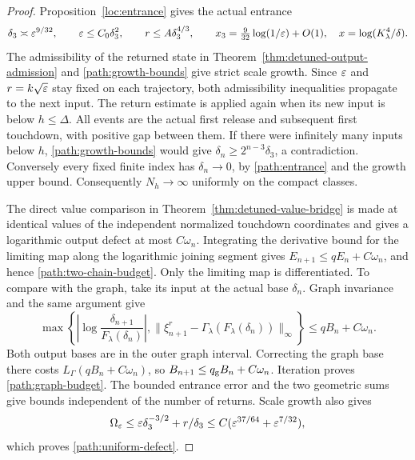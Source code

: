 \begin{proof}
Proposition~\ref{loc:entrance} gives the actual entrance
\begin{equation}
 \delta_3\asymp\varepsilon^{9/32},\qquad
 \varepsilon\le C_0\delta_3^2,\qquad
 r\le A\delta_3^{4/3},\qquad
 x_3=\tfrac9{32}\log(1/\varepsilon)+O(1),
 \quad x=\log(K_\lambda^4/\delta).
 \label{path:entrance}
\end{equation}
The admissibility of the returned state in
Theorem~\ref{thm:detuned-output-admission} and
\eqref{path:growth-bounds} give strict scale growth.  Since $\varepsilon$ and $r=k\sqrt{\varepsilon}$ stay
fixed on each trajectory, both admissibility inequalities propagate
to the next input.  The return estimate is applied again when its new input
is below $h\le\Delta$.  All events are the
actual first release and subsequent first touchdown, with positive
gap between them.  If there were infinitely many inputs below $h$,
\eqref{path:growth-bounds} would give $\delta_n\ge2^{n-3}\delta_3$,
a contradiction.  Conversely every fixed finite index has
$\delta_n\to0$, by \eqref{path:entrance} and the growth upper bound.
Consequently $N_h\to\infty$ uniformly on the compact classes.

The direct value comparison in
Theorem~\ref{thm:detuned-value-bridge} is made at identical values of the
independent normalized touchdown coordinates and gives a logarithmic output defect at most
$C\omega_n$.  Integrating the derivative bound for the limiting
map along the logarithmic joining segment gives
$E_{n+1}\le qE_n+C\omega_n$, and hence
\eqref{path:two-chain-budget}.  Only the limiting map is
differentiated.  To compare with the graph, take its input at the
actual base $\delta_n$.  Graph invariance and the same argument give
\[
 \max\left\{
 \left|\log\frac{\delta_{n+1}}{F_\lambda(\delta_n)}\right|,
 \|\xi_{n+1}^r-\Gamma_\lambda(F_\lambda(\delta_n))\|_\infty
 \right\}\le qB_n+C\omega_n.
\]
Both output bases are in the outer graph interval.  Correcting the
graph base there costs $L_\Gamma(qB_n+C\omega_n)$, so
$B_{n+1}\le q_{\rm g} B_n+C\omega_n$.  Iteration proves
\eqref{path:graph-budget}.  The bounded entrance error and the two
geometric sums give bounds independent of the number of returns.
Scale growth also gives
\[
 \Omega_\varepsilon\le\varepsilon\delta_3^{-3/2}+r/\delta_3
           \le C(\varepsilon^{37/64}+\varepsilon^{7/32}),
\]
which proves \eqref{path:uniform-defect}.


\end{proof}
